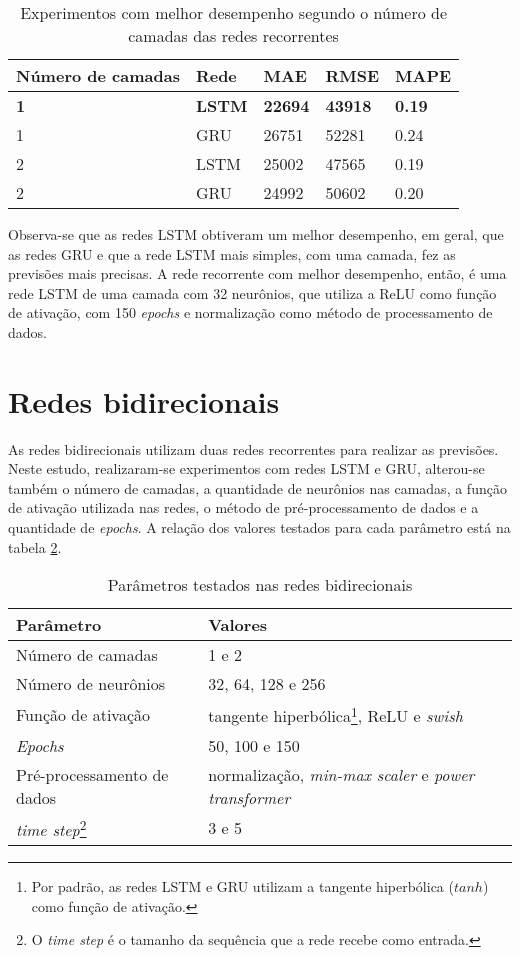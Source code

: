 \begin{table}[H]
    \centering
    \caption{Experimentos com melhor desempenho segundo o número de camadas das redes recorrentes}
    \begin{tabular}{lllll}
    \toprule
    Número de camadas & Rede & MAE & RMSE & MAPE \\
    \midrule
    \textbf{1} & \textbf{LSTM} & \textbf{22694}  & \textbf{43918} & \textbf{0.19}\\
    1 & GRU  & 26751  & 52281  & 0.24 \\
    2 & LSTM & 25002  & 47565 & 0.19  \\
    2 & GRU  & 24992  & 50602  & 0.20 \\
    \bottomrule
    \end{tabular}
    \label{tab:res-rnn}
\end{table}

Observa-se que as redes LSTM obtiveram um melhor desempenho, em geral, que as
redes GRU e que a rede LSTM mais simples, com uma camada, fez as previsões 
mais precisas. A rede recorrente com melhor desempenho, então, é uma rede LSTM 
de uma camada com 32 neurônios, que utiliza a ReLU como função de ativação, com 
150 \textit{epochs} e normalização como método de processamento de dados.

\section{Redes bidirecionais}

As redes bidirecionais utilizam duas redes recorrentes para 
realizar as previsões. Neste estudo, realizaram-se experimentos com redes
LSTM e GRU, alterou-se também o número de camadas, a quantidade de neurônios
nas camadas, a função de ativação utilizada nas redes, o método de pré-processamento
de dados e a quantidade de \textit{epochs}. A relação dos valores testados 
para cada parâmetro está na tabela \ref{tab:param-bi}.

\begin{table}[H]
    \centering
    \begin{tabular}{ll}
        \toprule
        Parâmetro           & Valores   \\
        \midrule
        Número de camadas   & 1 e 2 \\
        Número de neurônios & 32, 64, 128 e 256       \\
        Função de ativação  & tangente hiperbólica\footnote{Por padrão, as redes LSTM e GRU utilizam a tangente hiperbólica ($tanh$) como função de ativação.}, ReLU e \textit{swish}  \\
        \textit{Epochs}              & 50, 100 e 150      \\
        Pré-processamento de dados & normalização, \textit{min-max scaler} e \textit{power transformer}\\
        \textit{time step}\footnote{O \textit{time step} é o tamanho da sequência que a rede recebe como entrada.}  & 3 e 5 \\
        \bottomrule
    \end{tabular}
    \caption{Parâmetros testados nas redes bidirecionais}
    \label{tab:param-bi}
\end{table} 

